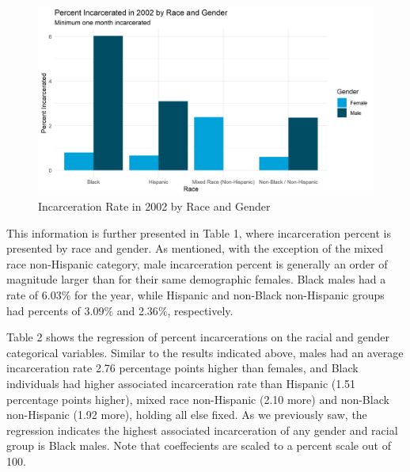 \documentclass{article}
\begin{document}
\begin{figure}[H]
    \begin{center}
        \includegraphics[width=.85\textwidth]{incarcerationpct_by_racegender}
    \end{center}
    \caption{Incarceration Rate in 2002 by Race and Gender}
    \label{fig:graph}
\end{figure}

This information is further presented in Table 1, where incarceration percent is presented by race and gender. As mentioned, with the exception of the mixed race non-Hispanic category, male incarceration percent is generally an order of magnitude larger than for their same demographic females. Black males had a rate of 6.03$\%$ for the year, while Hispanic and non-Black non-Hispanic groups had percents of 3.09$\%$ and 2.36$\%$, respectively. 



Table 2 shows the regression of percent incarcerations on the racial and gender categorical variables. Similar to the results indicated above, males had an average incarceration rate 2.76 percentage points higher than females, and Black individuals had higher associated incarceration rate than Hispanic (1.51 percentage points higher), mixed race non-Hispanic (2.10 more) and non-Black non-Hispanic (1.92 more), holding all else fixed. As we previously saw, the regression indicates the highest associated incarceration of any gender and racial group is Black males. Note that coeffecients are scaled to a percent scale out of 100. 
 

\end{document}

